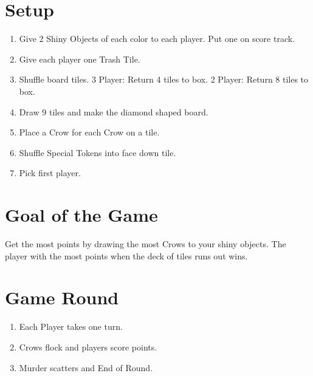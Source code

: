 \documentclass[12pt]{article}
\newenvironment{enumerateCustom}
{\begin{enumerate}
  \setlength{\itemsep}{1pt}
  \setlength{\parskip}{0pt}
  \setlength{\parsep}{0pt}}
{\end{enumerate}}
\begin{document}
\begin{mdframed}[style = customFrame]
\begin{multicols*}{2}

\section*{Setup}
\begin{enumerateCustom}
	\item Give 2 Shiny Objects of each color to each player. Put one on score track.
	\item Give each player one Trash Tile.
	\item Shuffle board tiles. 3 Player: Return 4 tiles to box. 2 Player: Return 8 tiles to box.
	\item Draw 9 tiles and make the diamond shaped board.
	\item Place a Crow for each Crow on a tile.
	\item Shuffle Special Tokens into face down tile.
	\item Pick first player.
\end{enumerateCustom}

\section*{Goal of the Game}
Get the most points by drawing the most Crows to your shiny objects. The player with the most points when the deck of tiles runs out wins.

\section*{Game Round}
\begin{enumerateCustom}
	\item Each Player takes one turn.
	\item Crows flock and players score points.
	\item Murder scatters and End of Round.
\end{enumerateCustom}


\end{multicols*}
\end{mdframed}
\end{document}
